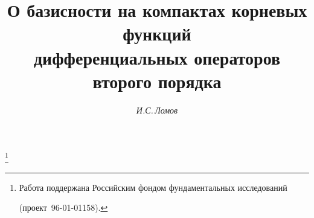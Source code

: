 









\newcommand{\sumn}{\sum\nolimits}


\newcommand{\dist}{\operatorname{dist}}




\newcommand{\re}{\operatorname{Re}}


\newcommand{\im}{\operatorname{Im}}






\newcommand{\const}{\operatorname{const}}


\newcommand{\tts}[1]{}










\setcounter{page}{40}












\author{\it И.С.\,Ломов}




\title{О базисности на компактах корневых функций\\


дифференциальных операторов второго порядка}





\thanks{Работа поддержана Российским фондом фундаментальных исследований


(проект \No\,96-01-01158).}


